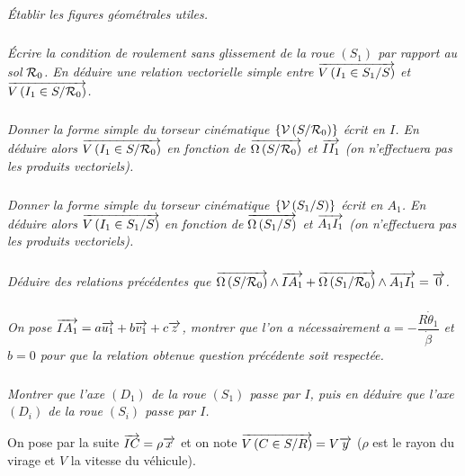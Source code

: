 \documentclass[10pt,fleqn]{article} %
\begin{document}
\begin{multicols}{2}
\subparagraph{}
\textit{Établir les figures géométrales utiles.}
\ifprof%
\begin{corrige}
\end{corrige}\else\fi

\subparagraph{}
\textit{Écrire la condition de roulement sans glissement de la roue $(S_1)$ par rapport au sol $\mathcal{R}_{0}$. En déduire une relation vectorielle simple entre $\overrightarrow{V\left( {I_1} \in {S_1}/{S}\right)}$ et $\overrightarrow{V\left( {I_1} \in {S}/{\mathcal{R}_{0}}\right)}$.}
\ifprof%
\begin{corrige}
\end{corrige}\else\fi

\subparagraph{}
\textit{Donner la forme simple du torseur cinématique $\left\{\mathcal{V} \left(S/\mathcal{R}_{0} \right) \right\}$ écrit en $I$. En déduire alors $\overrightarrow{V\left( {I_1} \in {S}/{\mathcal{R}_{0}}\right)}$ en fonction de $\overrightarrow{\Omega\left( {S}/{\mathcal{R}_{0}}\right)}$ et $\overrightarrow{II_1}$ (on n'effectuera pas les produits vectoriels).}
\ifprof%
\begin{corrige}
\end{corrige}\else\fi
\subparagraph{}
\textit{Donner la forme simple du torseur cinématique $\left\{\mathcal{V} \left(S_1/S \right) \right\}$ écrit en $A_1$. En déduire alors $\overrightarrow{V\left( {I_1} \in {S_1}/{S}\right)}$ en fonction de $\overrightarrow{\Omega\left( {S_1}/{S}\right)}$ et $\overrightarrow{A_1 I_1}$ (on n'effectuera pas les produits vectoriels).}
\ifprof%
\begin{corrige}
\end{corrige}\else\fi
\subparagraph{}
\textit{Déduire des relations précédentes que $\overrightarrow{\Omega\left( {S}/{\mathcal{R}_{0}}\right)}\wedge \overrightarrow{IA_1} + \overrightarrow{\Omega\left( {S_1}/{\mathcal{R}_{0}}\right)}\wedge \overrightarrow{A_1I_1}=\overrightarrow{0}$.}
\ifprof%
\begin{corrige}
\end{corrige}\else\fi
\subparagraph{}
\textit{On pose $\overrightarrow{IA_1}=a\overrightarrow{u_1}+b\overrightarrow{v_1}+c\overrightarrow{z}$, montrer que l'on a nécessairement $a=-\dfrac{R\dot{\theta}_1}{\dot{\beta}}$ et $b = 0$ pour que la relation obtenue question précédente soit respectée. }
\ifprof%
\begin{corrige}
\end{corrige}\else\fi
\subparagraph{}
\textit{ Montrer que l'axe $(D_1)$ de la roue $(S_1)$ passe par $I$,  puis en déduire que l'axe $(D_i )$ de la roue $(S_i )$ passe par $I$.}
\ifprof%
\begin{corrige}
\end{corrige}\else\fi


  On pose par la suite $\overrightarrow{IC}=\rho \overrightarrow{x}$ et on note $\overrightarrow{V\left( {C} \in {S}/{R}\right)} =V\overrightarrow{y}$ ($\rho$ est le rayon du virage et $V$ la vitesse du véhicule).
  

\end{multicols}
\end{document}
